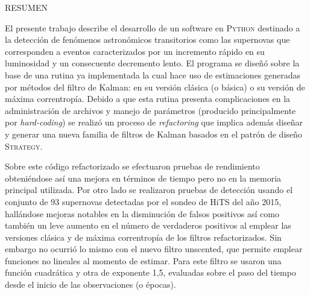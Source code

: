 


\begin{preface}
\begin{center}
\uppercase{Resumen}
\end{center}
El presente trabajo describe el desarrollo de un software en \textsc{Python} destinado a la detecci\'on de fen\'omenos astron\'omicos transitorios como las supernovas que corresponden a eventos caracterizados por un incremento r\'apido en su luminosidad y un consecuente decremento lento. El programa se dise\~n\'o sobre la base de una rutina ya implementada la cual hace uso de estimaciones generadas por m\'etodos del filtro de Kalman: en su versi\'on cl\'asica (o b\'asica) o su versi\'on de m\'axima correntrop\'ia. Debido a que esta rutina presenta complicaciones en la administraci\'on de archivos y manejo de par\'ametros (producido principalmente por \textit{hard-coding}) se realiz\'o un proceso de \textit{refactoring} que implica adem\'as dise\~nar y generar una nueva familia de filtros de Kalman basados en el patr\'on de dise\~no \textsc{Strategy}.
\bigskip

Sobre este c\'odigo refactorizado se efectuaron pruebas de rendimiento obteni\'endose as\'i una mejora en t\'erminos de tiempo pero no en la memoria principal utilizada. Por otro lado se realizaron pruebas de detecci\'on usando el conjunto de 93 supernovas detectadas por el sondeo de HiTS del a\~no 2015, hall\'andose mejoras notables en la disminuci\'on de falsos positivos as\'i como tambi\'en un leve aumento en el n\'umero de verdaderos positivos al emplear las versiones cl\'asica y de m\'axima correntrop\'ia de los filtros refactorizados. Sin embargo no ocurri\'o lo mismo con el nuevo filtro unscented, que permite emplear funciones no lineales al momento de estimar. Para este filtro se usaron una funci\'on cuadr\'atica y otra de exponente 1,5, evaluadas sobre el paso del tiempo desde el inicio de las observaciones (o \'epocas).   
\bigskip


\end{preface}

